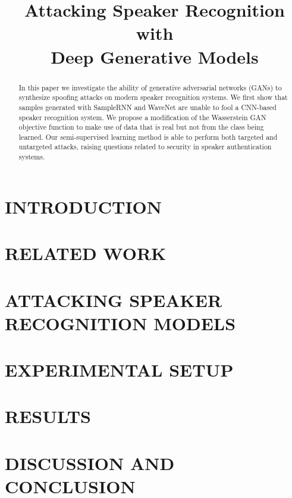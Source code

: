\documentclass{article}
\title{Attacking Speaker Recognition with \\Deep Generative Models}
\begin{document}
\maketitle
\begin{abstract}
    In this paper we investigate the ability of generative adversarial networks
    (GANs) to synthesize spoofing attacks on modern speaker recognition systems.
    We first show that samples generated with SampleRNN and WaveNet are
    unable to fool a CNN-based speaker recognition system. We propose  a
    modification of the Wasserstein GAN objective function to make use of data
    that is real but not from the class being learned. Our semi-supervised
    learning method is able to perform both targeted and untargeted attacks,
    raising questions related to security in speaker authentication systems. 
\end{abstract}

\section{INTRODUCTION} \label{sec:introduction}

%
\section{RELATED WORK}\label{sec:related_work}

%
\section{ATTACKING SPEAKER RECOGNITION MODELS}\label{sec:spk_rec_atks}

%
\section{EXPERIMENTAL SETUP}\label{sec:experiments}

%
\section{RESULTS}\label{sec:results}

%
\section{DISCUSSION AND CONCLUSION}\label{sec:conclusions}

%
\vfill\pagebreak




\end{document}
